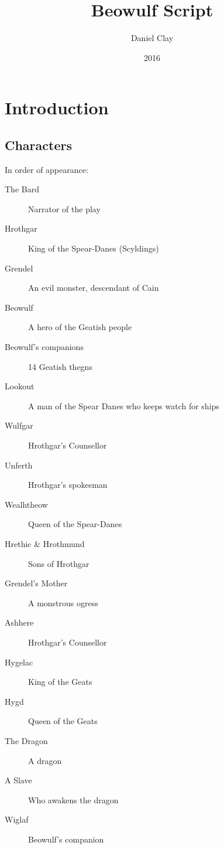 \documentclass[a4paper]{article}
\begin{document}
\title{Beowulf Script}
\date{2016}
\author{
Daniel Clay \\ 
}
\maketitle

\section{Introduction}

\subsection{Characters}%

In order of appearance:
\begin{description}
    \item[The Bard] Narrator of the play 
    \item[Hrothgar] King of the Spear-Danes (Scyldings)
    \item[Grendel] An evil monster, descendant of Cain
    \item[Beowulf] A hero of the Geatish people
    \item[Beowulf's companions] 14 Geatish thegns
    \item[Lookout] A man of the Spear Danes who keeps watch for ships
    \item[Wulfgar] Hrothgar's Counsellor
    \item[Unferth] Hrothgar's spokesman
    \item[Wealhtheow] Queen of the Spear-Danes
    \item[Hrethic \& Hrothmund] Sons of Hrothgar
    \item[Grendel's Mother] A monstrous ogress
    \item[Ashhere] Hrothgar's Counsellor
    \item[Hygelac] King of the Geats
    \item[Hygd] Queen of the Geats
    \item[The Dragon] A dragon
    \item[A Slave] Who awakens the dragon
    \item[Wiglaf] Beowulf's companion
\end{description}
\end{document}
